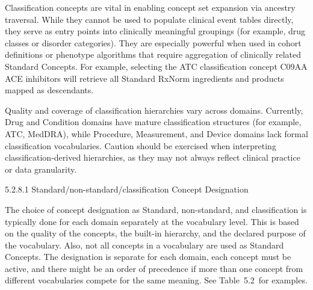 \documentclass[
  letterpaper,
  paper=7in:10in,
  pagesize=pdftex,
  headinclude=on,
  footinclude=on,
  12pt]{scrbook}
\begin{document}
Classification concepts are vital in enabling concept set expansion via
ancestry traversal. While they cannot be used to populate clinical event
tables directly, they serve as entry points into clinically meaningful
groupings (for example, drug classes or disorder categories). They are
especially powerful when used in cohort definitions or phenotype
algorithms that require aggregation of clinically related Standard
Concepts. For example, selecting the ATC classification concept C09AA
ACE inhibitors will retrieve all Standard RxNorm ingredients and
products mapped as descendants.

Quality and coverage of classification hierarchies vary across domains.
Currently, Drug and Condition domains have mature classification
structures (for example, ATC, MedDRA), while Procedure, Measurement, and
Device domains lack formal classification vocabularies. Caution should
be exercised when interpreting classification-derived hierarchies, as
they may not always reflect clinical practice or data granularity.

5.2.8.1 Standard/non-standard/classification Concept Designation

The choice of concept designation as Standard, non-standard, and
classification is typically done for each domain separately at the
vocabulary level. This is based on the quality of the concepts, the
built-in hierarchy, and the declared purpose of the vocabulary. Also,
not all concepts in a vocabulary are used as Standard Concepts. The
designation is separate for each domain, each concept must be active,
and there might be an order of precedence if more than one concept from
different vocabularies compete for the same meaning. See Table~5.2~for
examples.
\end{document}
